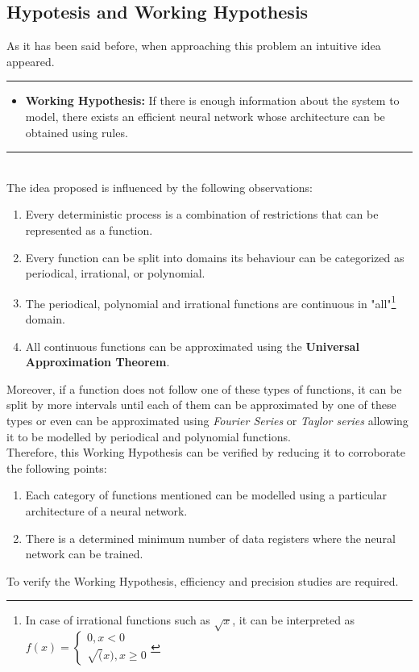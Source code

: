 \documentclass[a4paper, 11pt]{article}
\begin{document}
\subsection{Hypotesis and Working Hypothesis}
As it has been said before, when approaching this problem an intuitive idea appeared. \\
\rule{\linewidth}{0.4pt}
\begin{itemize}
    \item \textbf{Working Hypothesis:} If there is enough information about the system to model, there exists an efficient neural network whose architecture can be obtained using rules.
\end{itemize}
\rule{\linewidth}{0.4pt}\\ \vspace{0.5em}
The idea proposed is influenced by the following observations:
\begin{enumerate}
    \item Every deterministic process is a combination of restrictions that can be represented as a function.
    \item Every function can be split into domains its behaviour can be categorized as periodical, irrational, or polynomial.
    \item The periodical, polynomial and irrational functions are continuous in "all"\footnote{In case of irrational functions such as $\sqrt{x}$, it can be interpreted as $f(x) = \left\{ \begin{matrix} 0, x < 0 \\ \sqrt(x), x \geq 0 \end{matrix} \right.$} domain.
    \item All continuous functions can be approximated using the \textbf{Universal Approximation Theorem}.
\end{enumerate}
Moreover, if a function does not follow one of these types of functions, it can be split by more intervals until each of them can be approximated by one of these types or even can be approximated using \textit{Fourier Series} or \textit{Taylor series} allowing it to be modelled by periodical and polynomial functions.\\
Therefore, this Working Hypothesis can be verified by reducing it to corroborate the following points:
\begin{enumerate}
    \item Each category of functions mentioned can be modelled using a particular architecture of a neural network.
    \item There is a determined minimum number of data registers where the neural network can be trained.  
\end{enumerate}
To verify the Working Hypothesis, efficiency and precision studies are required.
\end{document}
